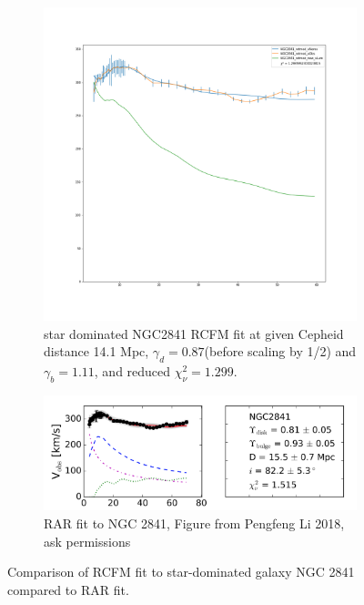 \documentclass[reprint,%
 amsmath,amssymb,
 aps,
]{revtex4-1}
\begin{document}
 \begin{figure}[ht] 
  \begin{subfigure}[b]{0.5\linewidth}
    \centering
    \includegraphics[width=0.8\linewidth]{figures/NGC2841_rotmod_XueSofue.png} 
    \caption{star dominated NGC2841 RCFM fit at given Cepheid distance 14.1 Mpc, $\gamma_d =0.87 $(before scaling by 1/2) and $\gamma_b =	1.11 $, and reduced $\chi^2_\nu = 1.299$.} 
    \label{fig:ngc2841} 
    \vspace{4ex}
  \end{subfigure}%
  \begin{subfigure}[b]{0.5\linewidth}
    \centering
    \includegraphics[width=0.99\linewidth]{figures/NGC2841_RarResults_Li2018} 
    \caption{RAR fit to NGC 2841, Figure from Pengfeng Li 2018,   ask permissions} 
    \label{fig:Li2018Rar} 
    \vspace{4ex}
  \end{subfigure} 
  \caption{Comparison of RCFM fit to star-dominated galaxy NGC 2841 compared to  RAR fit\cite{Li_2018}. }
  \label{fig:CompareNGC2841} 
\end{figure}
\end{document}
